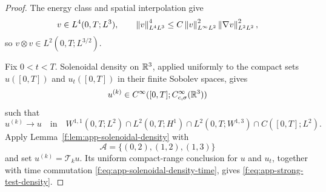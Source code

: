 \begin{proof}
The energy class and spatial interpolation give
\[
 v\in L^4(0,T;L^3),
 \qquad
 \left\lVert v\right\rVert_{L^4L^3}^4
 \le C\left\lVert v\right\rVert_{L^\infty L^2}^2
       \left\lVert \nabla v\right\rVert_{L^2L^2}^2,
\]
so \(v\otimes v\in L^2(0,T;L^{3/2})\).

Fix \(0<t<T\).  Solenoidal density on \(\mathbb R^3\), applied uniformly to the
compact sets \(u([0,T])\) and \(u_t([0,T])\) in their finite Sobolev spaces,
gives
\[
 u^{(k)}\in C^\infty([0,T];C_{c,\sigma}^\infty(\mathbb R^3))
\]
such that
\begin{equation}
 u^{(k)}\longrightarrow u
 \quad\text{in}\quad
 W^{1,1}(0,T;L^2)
 \cap L^2(0,T;H^1)
 \cap L^2(0,T;W^{1,3})
 \cap C([0,T];L^2).
 \label{f:eq:app-strong-test-density}
\end{equation}
Apply Lemma~\ref{f:lem:app-solenoidal-density} with
\[
 \mathscr A=\{(0,2),(1,2),(1,3)\}
\]
and set \(u^{(k)}=\mathcal T_ku\).  Its uniform compact-range conclusion
for \(u\) and \(u_t\), together with time commutation
\eqref{f:eq:app-solenoidal-density-time}, gives
\eqref{f:eq:app-strong-test-density}.


\end{proof}
